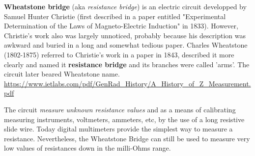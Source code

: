 {\bf Wheatstone bridge} (aka {\it resistance bridge}) is an electric circuit
developped by Samuel Hunter Christie (first described in a paper entitled
"Experimental  Determination of   the   Laws   of   Magneto-Electric Induction"
in  1833). However, Christie's work  also  was  largely  unnoticed, probably
because  his  description  was awkward  and  buried  in  a  long  and somewhat
 tedious    paper.  Charles     Wheatstone     (1802-1875)
referred to Christie's work in a paper in 1843, described it more clearly and
named it {\bf resistance bridge} and  its branches were called 'arms'. The
circuit later beared Wheatstone name.
\url{https://www.ietlabs.com/pdf/GenRad_History/A_History_of_Z_Measurement.pdf}

The circuit {\it measure unknown resistance values} and as a means of
calibrating measuring instruments, voltmeters, ammeters, etc, by the use of a
long resistive slide wire.
Today digital multimeters provide the simplest way to measure a resistance.
Nevertheless, the Wheatstone Bridge can still be used to measure very low values
of resistances down in the milli-Ohms range.
